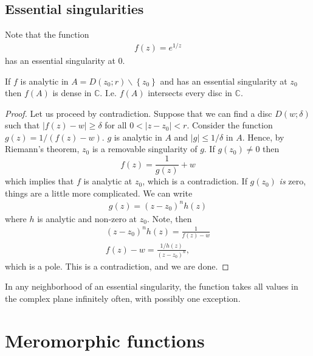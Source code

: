 \subsection{Essential singularities}

\begin{remark}
    Note that the function
    \begin{align*}
        f(z)=e^{1/z}
    \end{align*}
    has an essential singularity at 0.
\end{remark}

\begin{thm}
    If $f$ is analytic in $A=D(z_0;r)\backslash\left\{ z_0 \right\}$ and has an essential singularity at $z_0$ then $f(A)$ is dense
    in $\mathbb{C}$. I.e. $f(A)$ intersects every disc in $\mathbb{C}$.
\end{thm}

\begin{proof}
    Let us proceed by contradiction. Suppose that we can find a disc $D(w;\delta)$ such that $|f(z)-w|\geq\delta$ for all $0<|z-z_0|<r$.
    Consider the function $g(z)=1/(f(z)-w)$. $g$ is analytic in $A$ and $|g|\leq 1/\delta$ in $A$. Hence, by Riemann's theorem, $z_0$ is a 
    removable singularity of $g$. If $g(z_0)\neq0$ then
    \[f(z)=\frac{1}{g(z)}+w\]
    which implies that $f$ is analytic at $z_0$, which is a contradiction.
    If $g(z_0)$ \textit{is} zero, things are a little more complicated. We can write
    \begin{align*}
        g(z)=(z-z_0)^nh(z)
    \end{align*}
    where $h$ is analytic and non-zero at $z_0$. Note, then
    \begin{align*}
        (z-z_0)^nh(z)=\frac{1}{f(z)-w}\\
        f(z)-w=\frac{1/h(z)}{(z-z_0)^n},
    \end{align*}
    which is a pole. This is a contradiction, and we are done.
\end{proof}

\begin{thm}
    In any neighborhood of an essential singularity, the function takes all values in the complex plane infinitely often, with possibly one exception.
\end{thm}

\section{Meromorphic functions}

